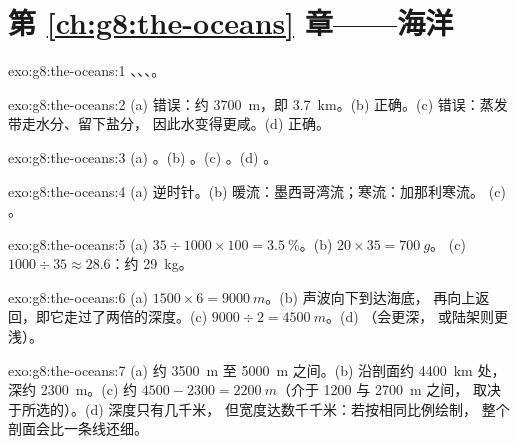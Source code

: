 \section*{第 \ref{ch:g8:the-oceans} 章——海洋}

\begin{solution}{exo:g8:the-oceans:1}
、、、。
\end{solution}

\begin{solution}{exo:g8:the-oceans:2}
(a) 错误：约 \qty{3700}{m}，即 \qty{3.7}{km}。(b) 正确。(c)
错误：蒸发带走水分、留下盐分，
因此水变得更咸。(d) 正确。
\end{solution}

\begin{solution}{exo:g8:the-oceans:3}
(a) 。(b) 。(c) 。(d) 。
\end{solution}

\begin{solution}{exo:g8:the-oceans:4}
(a) 逆时针。(b) 暖流：墨西哥湾流；寒流：加那利寒流。
(c) 。
\end{solution}

\begin{solution}{exo:g8:the-oceans:5}
(a) $35 \div 1000 \times 100 = 3.5~\%$。(b) $20 \times 35 = \qty{700}{g}$。
(c) $1000 \div 35 \approx 28.6$：约 \qty{29}{kg}。
\end{solution}

\begin{solution}{exo:g8:the-oceans:6}
(a) $1500 \times 6 = \qty{9000}{m}$。(b) 声波向下到达海底，
再向上返回，即它走过了两倍的深度。(c) $9000 \div 2 =
\qty{4500}{m}$。(d) （会更深，
或陆架则更浅）。
\end{solution}

\begin{solution}{exo:g8:the-oceans:7}
(a) 约 \qty{3500}{m} 至 \qty{5000}{m} 之间。(b) 沿剖面约 \qty{4400}{km} 处，深约 \qty{2300}{m}。(c) 约
$4500 - 2300 = \qty{2200}{m}$（介于 1200 与 \qty{2700}{m} 之间，
取决于所选的）。(d) 深度只有几千米，
但宽度达数千千米：若按相同比例绘制，
整个剖面会比一条线还细。
\end{solution}

